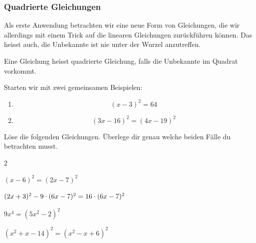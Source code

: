 \documentclass[11pt,oneside]{article}
\begin{document}
\subsubsection{Quadrierte Gleichungen}
	Als erste Anwendung betrachten wir eine neue Form von Gleichungen, die wir allerdings mit einem Trick auf die linearen Gleichungen zurückführen können. Das heisst auch, die Unbekannte ist nie unter der Wurzel anzutreffen.
	\begin{definition}
		Eine Gleichung heisst quadrierte Gleichung, falls die Unbekannte im Quadrat vorkommt.
	\end{definition}
	Starten wir mit zwei gemeinsamen Beispielen:\newpage
	\begin{beispiel}\begin{enumerate}
			\item \[(x-3)^2=64\]
			\item \[(3x-16)^2=(4x-19)^2\]
	\end{enumerate}\end{beispiel}
	\begin{aufgabe}
		Löse die folgenden Gleichungen. Überlege dir genau welche beiden Fälle du betrachten musst.
		\begin{enumerate}[label=\alph*)]\end{enumerate}
	\end{aufgabe}
\end{document}
